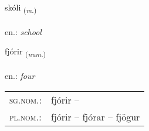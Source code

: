 \documentclass[frontgrid, backgrid]{flacards}\usepackage[]{graphicx}\usepackage[]{xcolor}
\begin{document}
\renewcommand{\flhead}{\vskip5pt \fboxsep=0pt {\small\bfseries\footnotesize Nafnorð | Noun}}
\renewcommand{\fcfoot}{\vskip5pt \fboxsep=0pt \hspace{2pt}{\small\bfseries\footnotesize 1K}}

\renewcommand{\blhead}{\vskip5pt {\small\bfseries\footnotesize Nafnorð | Noun }}
\renewcommand{\bcfoot}{\vskip5pt \hspace{2pt}{\small\bfseries\footnotesize 1K}}


{skóli \small{\textsubscript{(\textit{m.})}} \\[1ex] %
\textphonetic{[skouːlɪ]} \\
en.: \emph{school} \\  [2ex]
\renewcommand*{\arraystretch}{0.8}
}

\renewcommand{\flhead}{\vskip5pt \fboxsep=0pt {\small\bfseries\footnotesize Töluorð | Numeral}}
\renewcommand{\fcfoot}{\vskip5pt \fboxsep=0pt \hspace{2pt}{\small\bfseries\footnotesize 1K}}

\renewcommand{\blhead}{\vskip5pt {\small\bfseries\footnotesize Töluorð | Numeral }}
\renewcommand{\bcfoot}{\vskip5pt \hspace{2pt}{\small\bfseries\footnotesize 1K}}


{fjórir \small{\textsubscript{(\textit{num.})}} \\[1ex] %
\textphonetic{[fjouːrɪr]} \\
en.: \emph{four} \\  [2ex]
\renewcommand*{\arraystretch}{0.8}
\begin{tabular}{ll}
\textsc{sg.nom.}: & fjórir  -- \\ 
\textsc{pl.nom.}: & fjórir -- fjórar -- fjögur
\end{tabular}
}
\end{document}

